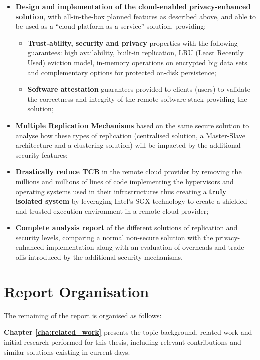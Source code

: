 \begin{itemize}
  \item \textbf{Design and implementation of the cloud-enabled privacy-enhanced solution}, with all-in-the-box planned features as described above, and able to be used as a “cloud-platform as a service” solution, providing:
 	\begin{itemize}
 		\item \textbf{Trust-ability, security and privacy} properties with the following guarantees: high availability, built-in replication, \gls{LRU} (Least Recently Used) eviction model, in-memory operations on encrypted big data sets and complementary options for protected on-disk persistence;
 		\item \textbf{Software attestation} guarantees provided to clients (users) to validate the correctness and integrity of the remote software stack providing the solution;
 	\end{itemize}
  \item \textbf{Multiple Replication Mechanisms} based on the same secure solution to analyse how these types of replication (centralised solution, a Master-Slave architecture and a clustering solution) will be impacted by the additional security features;
  \item \textbf{Drastically reduce TCB} in the remote cloud provider by removing the millions and millions of lines of code implementing the hypervisors and operating systems used in their infrastructures thus creating a \textbf{truly isolated system} by leveraging Intel's \gls{SGX} technology to create a shielded and trusted execution environment in a remote cloud provider;
  \item \textbf{Complete analysis report} of the different solutions of replication and security levels, comparing a normal non-secure solution with the privacy-enhanced implementation along with an evaluation of overheads and trade-offs introduced by the additional security mechanisms.
\end{itemize}

\section{Report Organisation}
\label{sec:report_organisation}

The remaining of the report is organised as follows:

\textbf{Chapter \ref{cha:related_work}} presents the topic background, related work and initial research performed for this thesis, including relevant contributions and similar solutions existing in current days.


